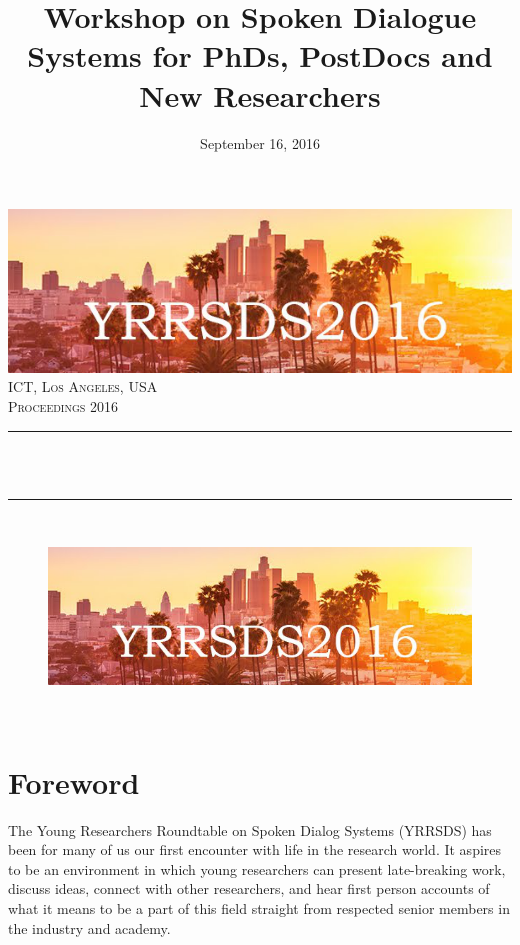 \documentclass[12pt]{article}
\title{Workshop on Spoken Dialogue Systems for PhDs, PostDocs and New Researchers}								%
\date{September 16, 2016}											%
\makeatletter
\let\thetitle\@title
\let\thedate\@date
\makeatother
\begin{document}

\begin{titlepage}
	\centering
    \vspace*{0.1 cm}
    \includegraphics[scale = 0.8]{yrrsds_logo.png}\\[1.0 cm]
    \textsc{\LARGE ICT, Los Angeles, USA}\\[2.0 cm]
	\textsc{\Large Proceedings 2016}\\[0.5 cm]
	\rule{\linewidth}{0.2 mm} \\[0.4 cm]
	{ \huge \bfseries \thetitle}\\
	\rule{\linewidth}{0.2 mm} \\[1.0 cm]
	
\begin{figure}[H]
\centering
    \includegraphics[scale=0.4]{yrrsds_logo.png} \\
\end{figure}
	
	{\large \thedate}\\[2 cm]
\end{titlepage}


\section*{Foreword}
The Young Researchers Roundtable on Spoken Dialog Systems (YRRSDS) has been for many of us our first encounter with life in the research world. It aspires to be an environment in which young researchers can present late-breaking work, discuss ideas, connect with other researchers, and hear first person accounts of what it means to be a part of this field straight from respected senior members in the industry and academy.
\end{document}
